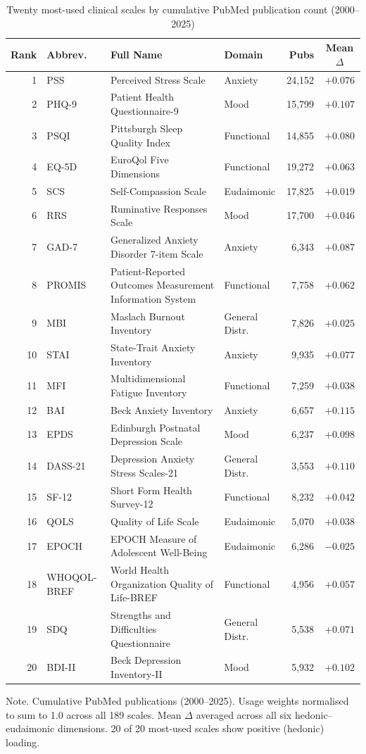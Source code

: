 \documentclass[12pt,a4paper]{article}
\newcommand{\floatnote}[1]{\par\vspace{4pt}\begin{minipage}{\linewidth}\small\textnormal{Note. #1}\end{minipage}}
\begin{document}
\begin{table}[H]
\caption{Twenty most-used clinical scales by cumulative PubMed publication count (2000--2025)}
\label{tab:s_top_usage}
\small
\begin{tabularx}{\textwidth}{rlXlrc}
\toprule
\textbf{Rank} & \textbf{Abbrev.} & \textbf{Full Name} & \textbf{Domain} & \textbf{Pubs} & \textbf{Mean $\Delta$} \\
\midrule
 1 & PSS & Perceived Stress Scale & Anxiety & 24,152 & $+0.076$ \\
 2 & PHQ-9 & Patient Health Questionnaire-9 & Mood & 15,799 & $+0.107$ \\
 3 & PSQI & Pittsburgh Sleep Quality Index & Functional & 14,855 & $+0.080$ \\
 4 & EQ-5D & EuroQol Five Dimensions & Functional & 19,272 & $+0.063$ \\
 5 & SCS & Self-Compassion Scale & Eudaimonic & 17,825 & $+0.019$ \\
 6 & RRS & Ruminative Responses Scale & Mood & 17,700 & $+0.046$ \\
 7 & GAD-7 & Generalized Anxiety Disorder 7-item Scale & Anxiety & 6,343 & $+0.087$ \\
 8 & PROMIS & Patient-Reported Outcomes Measurement Information System & Functional & 7,758 & $+0.062$ \\
 9 & MBI & Maslach Burnout Inventory & General Distr. & 7,826 & $+0.025$ \\
10 & STAI & State-Trait Anxiety Inventory & Anxiety & 9,935 & $+0.077$ \\
11 & MFI & Multidimensional Fatigue Inventory & Functional & 7,259 & $+0.038$ \\
12 & BAI & Beck Anxiety Inventory & Anxiety & 6,657 & $+0.115$ \\
13 & EPDS & Edinburgh Postnatal Depression Scale & Mood & 6,237 & $+0.098$ \\
14 & DASS-21 & Depression Anxiety Stress Scales-21 & General Distr. & 3,553 & $+0.110$ \\
15 & SF-12 & Short Form Health Survey-12 & Functional & 8,232 & $+0.042$ \\
16 & QOLS & Quality of Life Scale & Eudaimonic & 5,070 & $+0.038$ \\
17 & EPOCH & EPOCH Measure of Adolescent Well-Being & Eudaimonic & 6,286 & $-0.025$ \\
18 & WHOQOL-BREF & World Health Organization Quality of Life-BREF & Functional & 4,956 & $+0.057$ \\
19 & SDQ & Strengths and Difficulties Questionnaire & General Distr. & 5,538 & $+0.071$ \\
20 & BDI-II & Beck Depression Inventory-II & Mood & 5,932 & $+0.102$ \\
\bottomrule
\end{tabularx}
\floatnote{Cumulative PubMed publications (2000--2025). Usage weights normalised to sum to 1.0 across all 189 scales. Mean $\Delta$ averaged across all six hedonic--eudaimonic dimensions. 20 of 20 most-used scales show positive (hedonic) loading.}
\end{table}
\end{document}
